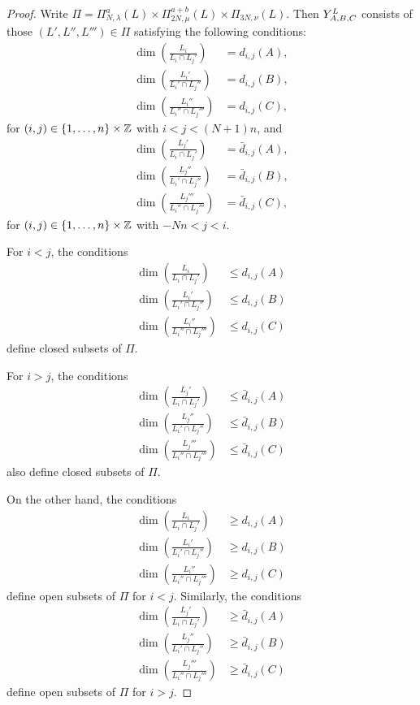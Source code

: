 \documentclass[a4paper, 11pt, twoside]{report}
\begin{document}
\begin{proof}
Write $\Pi=\Pi_{N,\lambda}^a(L)\times\Pi_{2N,\mu}^{a+b}(L)\times\Pi_{3N,\nu}(L)$. Then $\yprod[L]{A,B,C}$ consists of those $(L',L'',L''')\in\Pi$ satisfying the following conditions:
\begin{align}
\dim\left(\frac{L_i}{L_i\cap L_j'}\right) &= d_{i,j}{(A)},\\
\dim\left(\frac{L_i'}{L_i'\cap L_j''}\right) &= d_{i,j}{(B)},\\
\dim\left(\frac{L_i''}{L_i''\cap L_j'''}\right) &= d_{i,j}{(C)},
\end{align}
for $(i,j)\in \{1,\ldots,n\}\times\integers$ with $i<j<(N+1)n$, and
\begin{align}
\dim\left(\frac{L_j'}{L_i\cap L_j'}\right) &= \bar{d}_{i,j}{(A)},\\
\dim\left(\frac{L_j''}{L_i'\cap L_j''}\right) &= \bar{d}_{i,j}{(B)},\\
\dim\left(\frac{L_j'''}{L_i''\cap L_j'''}\right) &= \bar{d}_{i,j}{(C)},
\end{align}
for $(i,j)\in \{1,\ldots,n\}\times\integers$ with $-Nn<j<i$.

For $i<j$, the conditions
\begin{align*}
\dim\left(\frac{L_i}{L_i\cap L_j'}\right) &\le d_{i,j}{(A)}\\
\dim\left(\frac{L_i'}{L_i'\cap L_j''}\right) &\le d_{i,j}{(B)}\\
\dim\left(\frac{L_i''}{L_i''\cap L_j'''}\right) &\le d_{i,j}{(C)}
\end{align*}
define closed subsets of $\Pi$.

For $i>j$, the conditions
\begin{align*}
\dim\left(\frac{L_j'}{L_i\cap L_j'}\right) &\le \bar{d}_{i,j}{(A)}\\
\dim\left(\frac{L_j''}{L_i'\cap L_j''}\right) &\le \bar{d}_{i,j}{(B)}\\
\dim\left(\frac{L_j'''}{L_i''\cap L_j'''}\right) &\le \bar{d}_{i,j}{(C)}
\end{align*}
also define closed subsets of $\Pi$.

On the other hand, the conditions
\begin{align*}
\dim\left(\frac{L_i}{L_i\cap L_j'}\right) &\geq d_{i,j}{(A)}\\
\dim\left(\frac{L_i'}{L_i'\cap L_j''}\right) &\geq d_{i,j}{(B)}\\
\dim\left(\frac{L_i''}{L_i''\cap L_j'''}\right) &\geq d_{i,j}{(C)}
\end{align*}
define open subsets of $\Pi$ for $i<j$. Similarly, the conditions
\begin{align*}
\dim\left(\frac{L_j'}{L_i\cap L_j'}\right) &\geq \bar{d}_{i,j}{(A)}\\
\dim\left(\frac{L_j''}{L_i'\cap L_j''}\right) &\geq \bar{d}_{i,j}{(B)}\\
\dim\left(\frac{L_j'''}{L_i''\cap L_j'''}\right) &\geq \bar{d}_{i,j}{(C)}
\end{align*}
define open subsets of $\Pi$ for $i>j$.


\end{proof}
\end{document}
